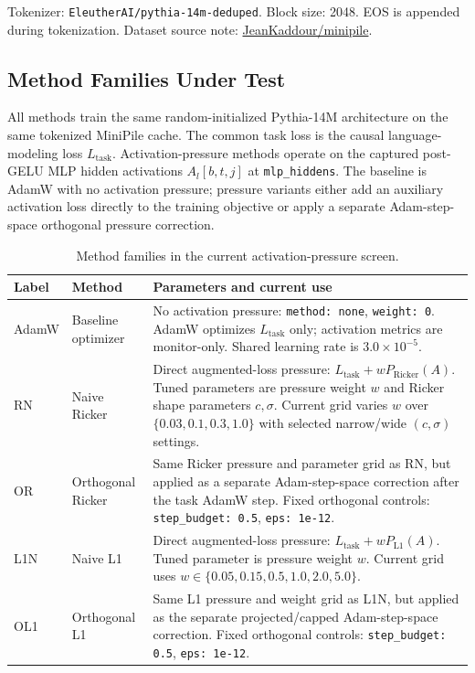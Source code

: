 \documentclass[10pt]{article}
\newcommand{\code}[1]{\texttt{#1}}
\begin{document}
Tokenizer: \code{EleutherAI/pythia-14m-deduped}. Block size: 2048. EOS is appended during tokenization. Dataset source note: \href{https://huggingface.co/datasets/JeanKaddour/minipile}{JeanKaddour/minipile}.

\subsection*{Method Families Under Test}

All methods train the same random-initialized Pythia-14M architecture on the same tokenized MiniPile cache. The common task loss is the causal language-modeling loss $L_{\mathrm{task}}$. Activation-pressure methods operate on the captured post-GELU MLP hidden activations $A_l[b,t,j]$ at \code{mlp\_hiddens}. The baseline is AdamW with no activation pressure; pressure variants either add an auxiliary activation loss directly to the training objective or apply a separate Adam-step-space orthogonal pressure correction.

\begin{table}[H]
\centering
\caption{Method families in the current activation-pressure screen.}
\small
\begin{tabularx}{\textwidth}{llX}
\toprule
Label & Method & Parameters and current use \\
\midrule
AdamW & Baseline optimizer & No activation pressure: \code{method: none}, \code{weight: 0}. AdamW optimizes $L_{\mathrm{task}}$ only; activation metrics are monitor-only. Shared learning rate is $3.0\times10^{-5}$. \\
RN & Naive Ricker & Direct augmented-loss pressure: $L_{\mathrm{task}} + wP_{\mathrm{Ricker}}(A)$. Tuned parameters are pressure weight $w$ and Ricker shape parameters $c,\sigma$. Current grid varies $w$ over $\{0.03,0.1,0.3,1.0\}$ with selected narrow/wide $(c,\sigma)$ settings. \\
OR & Orthogonal Ricker & Same Ricker pressure and parameter grid as RN, but applied as a separate Adam-step-space correction after the task AdamW step. Fixed orthogonal controls: \code{step\_budget: 0.5}, \code{eps: 1e-12}. \\
L1N & Naive L1 & Direct augmented-loss pressure: $L_{\mathrm{task}} + wP_{\mathrm{L1}}(A)$. Tuned parameter is pressure weight $w$. Current grid uses $w \in \{0.05,0.15,0.5,1.0,2.0,5.0\}$. \\
OL1 & Orthogonal L1 & Same L1 pressure and weight grid as L1N, but applied as the separate projected/capped Adam-step-space correction. Fixed orthogonal controls: \code{step\_budget: 0.5}, \code{eps: 1e-12}. \\
\bottomrule
\end{tabularx}
\end{table}
\end{document}
